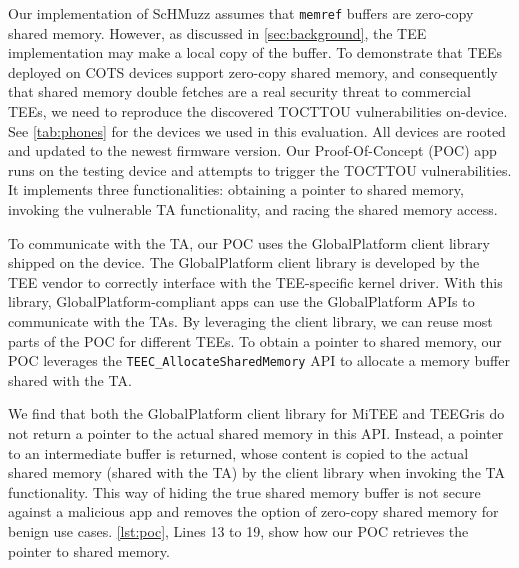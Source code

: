 \documentclass[conference]{IEEEtran}
\newcommand{\sysname}{ScHMuzz\xspace}
\newcommand{\mitee}{MiTEE\xspace}
\newcommand{\teegris}{TEEGris\xspace}
\begin{document}
Our implementation of \sysname assumes that \texttt{memref} buffers are zero-copy shared memory. 
However, as discussed in \autoref{sec:background}, the TEE implementation may 
make a local copy of the buffer. 
To demonstrate that TEEs deployed on COTS devices support zero-copy shared memory, 
and consequently that shared memory 
double fetches are a real security threat to commercial TEEs, we need to reproduce the discovered TOCTTOU  
vulnerabilities on-device. See \autoref{tab:phones} for the devices 
we used in this evaluation. All devices are rooted and updated to the newest 
firmware version.  
Our Proof-Of-Concept (POC) app runs on the testing device and attempts to trigger the TOCTTOU  
vulnerabilities. It implements three functionalities: 
obtaining a pointer to shared memory, invoking the vulnerable TA functionality, 
and racing the shared memory access. 

To communicate with the TA, our POC uses the GlobalPlatform client library shipped on the device. 
The GlobalPlatform client library is developed by the TEE vendor to correctly interface with 
the TEE-specific kernel driver. With this library, GlobalPlatform-compliant 
apps can use the GlobalPlatform APIs to communicate with the TAs. By leveraging the client library, we can reuse most
parts of the POC for different TEEs. To obtain a pointer to shared memory, our POC 
leverages the \texttt{TEEC\_AllocateSharedMemory} API to allocate a memory buffer 
shared with the TA. 

We find that both the GlobalPlatform client library for \mitee 
and \teegris do not return a pointer to the actual shared memory in this API. 
Instead, a pointer to an intermediate buffer is returned, whose content is copied 
to the actual shared memory (shared with the TA) by the client library when invoking the TA 
functionality. This way of hiding the true shared memory buffer is not secure against a malicious 
app and removes the option of zero-copy shared memory for benign use cases. 
\autoref{lst:poc}, Lines 13 to 19, show how our POC retrieves the pointer to shared memory.
\end{document}
